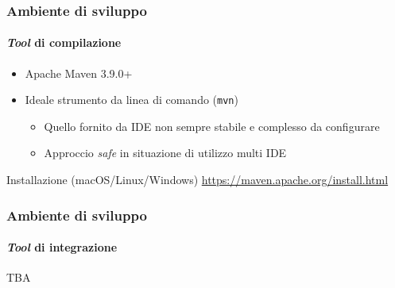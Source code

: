 \begin{frame}[t,fragile] \frametitle{Ambiente di sviluppo}
\framesubtitle{\textit{Tool} di compilazione}
    \begin{itemize}[leftmargin=20pt,align=right]
        \item[\alert{\faArrowCircleRight}] Apache Maven \alert{3.9.0+}
        \item[\alert{\faArrowCircleRight}] Ideale strumento da \alert{linea di comando} (\texttt{mvn})
        \begin{itemize}[leftmargin=20pt,align=right]
            \item[\alert{\faArrowCircleRight}] Quello fornito da IDE non sempre stabile e complesso da configurare
            \item[\alert{\faArrowCircleRight}] Approccio \textit{safe} in situazione di utilizzo multi IDE
        \end{itemize}
    \end{itemize}
    \begin{block}{Installazione (macOS/Linux/Windows)}
        \url{https://maven.apache.org/install.html}
    \end{block}
\end{frame}
%
\begin{frame}[t,fragile] \frametitle{Ambiente di sviluppo}
\framesubtitle{\textit{Tool} di integrazione}
TBA
\end{frame}    
%
